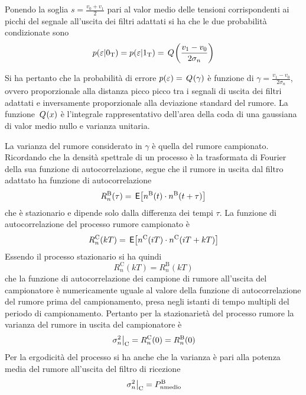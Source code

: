 Ponendo la soglia $s=\frac{v_0+v_1}{2}$ pari al valor medio delle tensioni corrispondenti ai picchi del segnale all'uscita dei filtri adattati si ha che le due probabilità condizionate sono 
\begin{equation}p(\varepsilon|0_\text{T})=p(\varepsilon|1_\text{T})=\,{Q}^{}\!\left({\frac{v_1-v_0}{2\sigma_n}}\right)\end{equation}

Si ha pertanto che la probabilità di errore $p(\varepsilon)=\,{Q}^{}\!\left({\gamma}\right)$ è funzione di $\gamma=\frac{v_1-v_0}{2\sigma_n}$, ovvero proporzionale alla distanza picco picco tra i segnali di uscita dei filtri adattati e inversamente proporzionale alla deviazione standard del rumore. La funzione $\,{Q}^{}\!\left({x}\right)$ è l'integrale rappresentativo dell'area della coda di una gaussiana di valor medio nullo e varianza unitaria.

La varianza del rumore considerato in $\gamma$ è quella del rumore campionato. Ricordando che la densità spettrale di un processo è la trasformata di Fourier della sua funzione di autocorrelazione, segue che il rumore in uscita dal filtro adattato ha funzione di autocorrelazione
\begin{equation}
R_n^\text{B}(\tau)=\,{\operatorname{\mathsf{E}}}\!\left[{n^\text{B}(t)\cdot n^\text{B}(t+\tau)}\right]
\end{equation}
che è stazionario e dipende solo dalla differenza dei tempi $\tau$.
La funzione di autocorrelazione del processo rumore campionato è
\begin{equation}
R_n^\text{C}(k T)=\,{\operatorname{\mathsf{E}}}\!\left[{n^\text{C}(i T)\cdot n^\text{C}(i T+k T)}\right]
\end{equation}
Essendo il processo stazionario si ha quindi 
\begin{equation}
R_n^\text{C}(k T)=R_n^\text{B}(k T)
\end{equation}
che la funzione di autocorrelazione dei campione di rumore all'uscita del campionatore è numericamente uguale al valore della funzione di autocorrelazione del rumore prima del campionamento, presa negli istanti di tempo multipli del periodo di campionamento. Pertanto per la stazionarietà del processo rumore la varianza del rumore in uscita del campionatore è 
\begin{equation}
\left.{\sigma^2_n}\right\rvert_{\text{C}}=R_n^\text{C}(0)=R_n^\text{B}(0)
\end{equation}
Per la ergodicità del processo si ha anche che la varianza è pari alla potenza media del rumore all'uscita del filtro di ricezione 
\begin{equation}
\left.{\sigma^2_n}\right\rvert_{\text{C}}=P_{n \text{medio}}^\text{B}
\end{equation}

